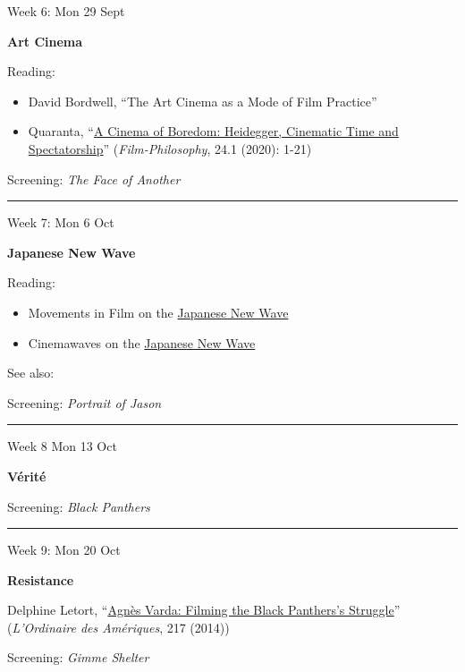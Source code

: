 \documentclass[
  letterpaper,
  DIV=11,
  numbers=noendperiod,
  oneside]{scrartcl}
\providecommand{\tightlist}{%
  \setlength{\itemsep}{0pt}\setlength{\parskip}{0pt}}
\begin{document}
Week 6: Mon 29 Sept

\textbf{Art Cinema}

Reading:

\begin{itemize}
\tightlist
\item
  David Bordwell, ``The Art Cinema as a Mode of Film Practice''
\item
  Quaranta, ``\href{pdf/quaranta.pdf}{A Cinema of Boredom: Heidegger,
  Cinematic Time and Spectatorship}'' (\emph{Film-Philosophy}, 24.1
  (2020): 1-21)
\end{itemize}

Screening: \emph{The Face of Another}

\begin{center}\rule{0.5\linewidth}{0.5pt}\end{center}

Week 7: Mon 6 Oct

\textbf{Japanese New Wave}

Reading:

\begin{itemize}
\tightlist
\item
  Movements in Film on the
  \href{https://www.movementsinfilm.com/japanese-new-wave}{Japanese New
  Wave}
\item
  Cinemawaves on the
  \href{https://cinemawavesblog.com/movements/japanese-new-wave/}{Japanese
  New Wave}
\end{itemize}

See also:

Screening: \emph{Portrait of Jason}

\begin{center}\rule{0.5\linewidth}{0.5pt}\end{center}

Week 8 Mon 13 Oct

\textbf{Vérité}

Screening: \emph{Black Panthers}

\begin{center}\rule{0.5\linewidth}{0.5pt}\end{center}

Week 9: Mon 20 Oct

\textbf{Resistance}

Delphine Letort,
``\href{https://canvas.emerson.edu/courses/2040561/files/168958619?wrap=1}{Agnès
Varda: Filming the Black Panthers's Struggle}'' (\emph{L'Ordinaire des
Amériques}, 217 (2014))

Screening: \emph{Gimme Shelter}
\end{document}
